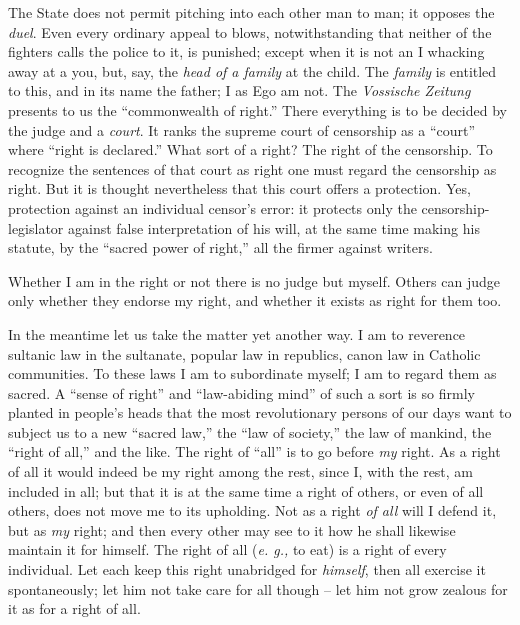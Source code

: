 \documentclass[12pt,a4paper]{book}
\begin{document}
The State does not permit pitching into each other man to man; it opposes the 
\textit{duel}. Even every ordinary appeal to blows, notwithstanding that 
neither of the fighters calls the police to it, is punished; except when it is 
not an I whacking away at a you, but, say, the \textit{head of a family} at 
the child. The \textit{family} is entitled to this, and in its name the 
father; I as Ego am not. The \textit{Vossische Zeitung} presents to us the 
``commonwealth of right.'' There everything is to be decided by the judge 
and a \textit{court}. It ranks the supreme court of censorship as a 
``court'' where ``right is declared.'' What sort of a right? The right of 
the censorship. To recognize the sentences of that court as right one must 
regard the censorship as right. But it is thought nevertheless that this court 
offers a protection. Yes, protection against an individual censor's error: it 
protects only the censorship-legislator against false interpretation of his 
will, at the same time making his statute, by the ``sacred power of right,'' 
all the firmer against writers.

Whether I am in the right or not there is no judge but myself. Others can 
judge only whether they endorse my right, and whether it exists as right for 
them too.

In the meantime let us take the matter yet another way. I am to reverence 
sultanic law in the sultanate, popular law in republics, canon law in Catholic 
communities. To these laws I am to subordinate myself; I am to regard them as 
sacred. A ``sense of right'' and ``law-abiding mind'' of such a sort is so 
firmly planted in people's heads that the most revolutionary persons of our 
days want to subject us to a new ``sacred law,'' the ``law of society,'' 
the law of mankind, the ``right of all,'' and the like. The right of 
``all'' is to go before \textit{my} right. As a right of all it would indeed 
be my right among the rest, since I, with the rest, am included in all; but 
that it is at the same time a right of others, or even of all others, does not 
move me to its upholding. Not as a right \textit{of all} will I defend it, but 
as \textit{my} right; and then every other may see to it how he shall likewise 
maintain it for himself. The right of all (\textit{e. g.,} to eat) is a right 
of every individual. Let each keep this right unabridged for \textit{himself}, 
then all exercise it spontaneously; let him not take care for all though -- 
let him not grow zealous for it as for a right of all.
\end{document}
